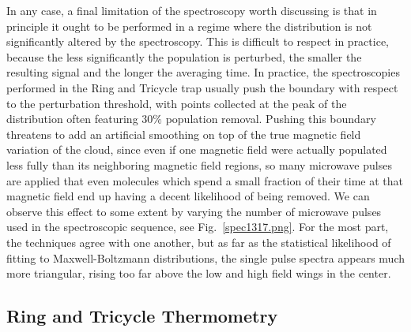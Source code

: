 \documentclass[defaultstyle,11pt]{thesis}
\begin{document}
In any case, a final limitation of the spectroscopy worth discussing is that in principle it ought to be performed in a regime where the distribution is not significantly altered by the spectroscopy.
This is difficult to respect in practice, because the less significantly the population is perturbed, the smaller the resulting signal and the longer the averaging time.
In practice, the spectroscopies performed in the Ring and Tricycle trap usually push the boundary with respect to the perturbation threshold, with points collected at the peak of the distribution often featuring $30\%$ population removal.
Pushing this boundary threatens to add an artificial smoothing on top of the true magnetic field variation of the cloud, since even if one magnetic field were actually populated less fully than its neighboring magnetic field regions, so many microwave pulses are applied that even molecules which spend a small fraction of their time at that magnetic field end up having a decent likelihood of being removed.
We can observe this effect to some extent by varying the number of microwave pulses used in the spectroscopic sequence, see Fig.~\ref{spec1317.png}.
For the most part, the techniques agree with one another, but as far as the statistical likelihood of fitting to Maxwell-Boltzmann distributions, the single pulse spectra appears much more triangular, rising too far above the low and high field wings in the center.


\subsection{Ring and Tricycle Thermometry}
\end{document}
